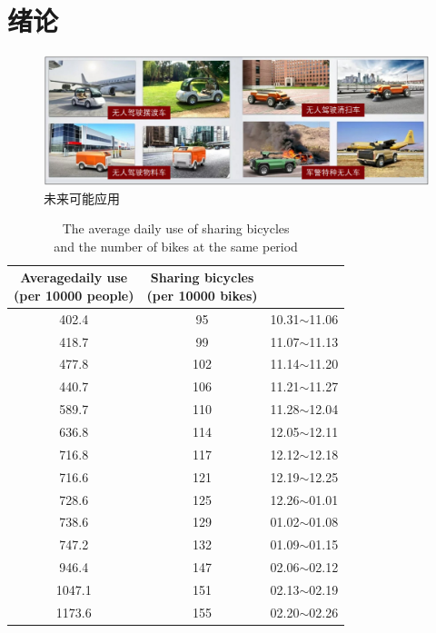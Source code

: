 \newpage
\section{绪论}

\begin{figure}[htbp]
	\centering
	\includegraphics[width = 1\textwidth]{fig/wlknyy.png}
	\caption{未来可能应用}
	\label{wlknyy}
\end{figure}

\begin{table}[htbp]
	\centering%
	\caption[centering]{The average daily use of sharing bicycles \protect\\and the number of bikes at the same period}%
	\label{共享单车日均使用总量与对应时间段的共享单车数量}%
	\begin{tabular}{ccc}
		\toprule
		\tabincell{c}{Averagedaily use\\(per 10000 people)} &\tabincell{c}{Sharing bicycles\\(per 10000 bikes)} &\tabincell{c}{Period}\\ 
		\midrule
		402.4 & 95 & 10.31$\sim$11.06 \\
		418.7 & 99 & 11.07$\sim$11.13 \\
		477.8 & 102 & 11.14$\sim$11.20 \\
		440.7 & 106 & 11.21$\sim$11.27 \\
		589.7 & 110 & 11.28$\sim$12.04 \\
		636.8 & 114 & 12.05$\sim$12.11 \\
		716.8 & 117 & 12.12$\sim$12.18 \\
		716.6 & 121 & 12.19$\sim$12.25 \\
		728.6 & 125 & 12.26$\sim$01.01 \\
		738.6 & 129 & 01.02$\sim$01.08 \\
		747.2 & 132 & 01.09$\sim$01.15 \\
		946.4 & 147 & 02.06$\sim$02.12 \\
		1047.1 & 151 & 02.13$\sim$02.19 \\
		1173.6 & 155 & 02.20$\sim$02.26 \\
		\bottomrule
	\end{tabular}
\end{table}

